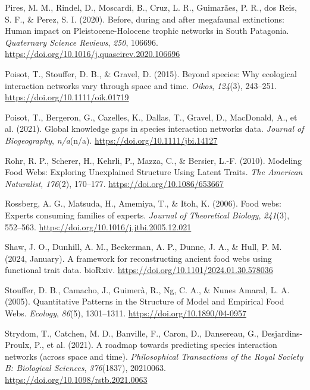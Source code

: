 \documentclass[
]{agujournal2019}
\newlength{\cslhangindent}
\newenvironment{CSLReferences}[2] %
 {\begin{list}{}{%
  \setlength{\itemindent}{0pt}
  \setlength{\leftmargin}{0pt}
  \setlength{\parsep}{0pt}
  \ifodd #1
   \setlength{\leftmargin}{\cslhangindent}
   \setlength{\itemindent}{-1\cslhangindent}
  \fi
  \setlength{\itemsep}{#2\baselineskip}}}
 {\end{list}}
\begin{document}
\begin{CSLReferences}{1}{0}
Pires, M. M., Rindel, D., Moscardi, B., Cruz, L. R., Guimarães, P. R.,
dos Reis, S. F., \& Perez, S. I. (2020). Before, during and after
megafaunal extinctions: {Human} impact on {Pleistocene-Holocene} trophic
networks in {South Patagonia}. \emph{Quaternary Science Reviews},
\emph{250}, 106696.
\url{https://doi.org/10.1016/j.quascirev.2020.106696}

Poisot, T., Stouffer, D. B., \& Gravel, D. (2015). Beyond species: Why
ecological interaction networks vary through space and time.
\emph{Oikos}, \emph{124}(3), 243--251.
\url{https://doi.org/10.1111/oik.01719}

Poisot, T., Bergeron, G., Cazelles, K., Dallas, T., Gravel, D.,
MacDonald, A., et al. (2021). Global knowledge gaps in species
interaction networks data. \emph{Journal of Biogeography},
\emph{n/a}(n/a). \url{https://doi.org/10.1111/jbi.14127}

Rohr, R. P., Scherer, H., Kehrli, P., Mazza, C., \& Bersier, L.-F.
(2010). Modeling {Food Webs}: {Exploring Unexplained Structure Using
Latent Traits}. \emph{The American Naturalist}, \emph{176}(2), 170--177.
\url{https://doi.org/10.1086/653667}

Rossberg, A. G., Matsuda, H., Amemiya, T., \& Itoh, K. (2006). Food
webs: {Experts} consuming families of experts. \emph{Journal of
Theoretical Biology}, \emph{241}(3), 552--563.
\url{https://doi.org/10.1016/j.jtbi.2005.12.021}

Shaw, J. O., Dunhill, A. M., Beckerman, A. P., Dunne, J. A., \& Hull, P.
M. (2024, January). A framework for reconstructing ancient food webs
using functional trait data. {bioRxiv}.
\url{https://doi.org/10.1101/2024.01.30.578036}

Stouffer, D. B., Camacho, J., Guimerà, R., Ng, C. A., \& Nunes Amaral,
L. A. (2005). Quantitative {Patterns} in the {Structure} of {Model} and
{Empirical Food Webs}. \emph{Ecology}, \emph{86}(5), 1301--1311.
\url{https://doi.org/10.1890/04-0957}

Strydom, T., Catchen, M. D., Banville, F., Caron, D., Dansereau, G.,
Desjardins-Proulx, P., et al. (2021). A roadmap towards predicting
species interaction networks (across space and time).
\emph{Philosophical Transactions of the Royal Society B: Biological
Sciences}, \emph{376}(1837), 20210063.
\url{https://doi.org/10.1098/rstb.2021.0063}


\end{CSLReferences}
\end{document}
